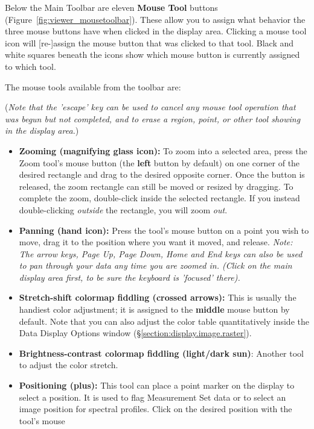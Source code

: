 Below the Main Toolbar are eleven {\bf Mouse Tool} buttons
(Figure~\ref{fig:viewer_mousetoolbar}). These allow you to assign
what behavior the three mouse buttons have when clicked in the display area. Clicking a mouse 
tool icon will [re-]assign the mouse button that was clicked to that tool. 
Black and white squares beneath the icons show which mouse button is currently
assigned to which tool.  

The mouse tools available from the toolbar are:

({\em Note that the 'escape' key can be used to cancel any mouse tool operation that was
begun but not completed, and to erase a region, point, or other tool showing in the display area.})

\begin{itemize}
   \item {\bf Zooming (magnifying glass icon):}
     To zoom into a selected area, press the Zoom tool's mouse button
     (the {\bf left} button by default) on one corner of the desired
     rectangle and drag to the desired opposite corner. Once the button is
     released, the zoom rectangle can still be moved or resized by dragging.
     To complete the zoom, double-click inside the selected rectangle. If you
     instead double-clicking {\it outside} the rectangle, you will zoom {\it out}.
   \item {\bf Panning (hand icon):} Press the tool's mouse button on a 
     point you wish to move, drag it to the position where you want it
     moved, and release. {\it Note: The arrow keys, Page Up, Page Down,
     Home and End keys can also be used to pan through your data any time
     you are zoomed in. (Click on the main display area first, to be sure
     the keyboard is 'focused' there).}
   \item {\bf Stretch-shift colormap fiddling (crossed arrows):} This is
     usually the handiest color adjustment; it is assigned to the {\bf middle}
     mouse button by default. Note that you can also adjust the color table
     quantitatively inside the Data Display Options window (\S \ref{section:display.image.raster}).
   \item {\bf Brightness-contrast colormap fiddling (light/dark sun)}: Another tool to adjust
   the color stretch.
   \item {\bf Positioning (plus):} This tool can place a point
     marker on the display to select a position. It is used to flag
     Measurement Set data or to select an image position for spectral
     profiles.  Click on the desired position with the tool's mouse

\end{itemize}
